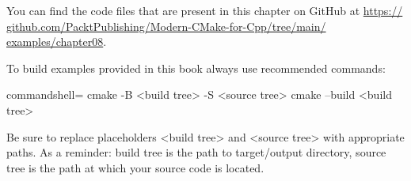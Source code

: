 You can find the code files that are present in this chapter on GitHub at \url{https:// github.com/PacktPublishing/Modern-CMake-for-Cpp/tree/main/ examples/chapter08}.

To build examples provided in this book always use recommended commands:

\begin{tcblisting}{commandshell={}}
cmake -B <build tree> -S <source tree>
cmake --build <build tree>
\end{tcblisting}

Be sure to replace placeholders <build tree> and <source tree> with appropriate paths. As a reminder: build tree is the path to target/output directory, source tree is the path at which your source code is located.